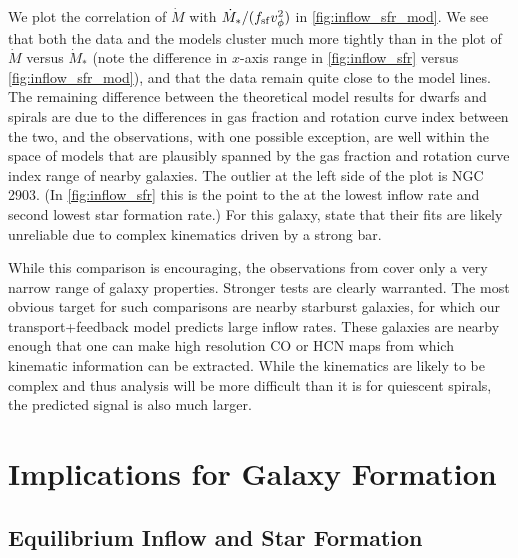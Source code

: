 \documentclass[useAMS,usenatbib]{mn2e}
\begin{document}
We plot the correlation of $\dot{M}$ with $\dot{M}_*/(f_{\rm sf} v_\phi^2)$ in \autoref{fig:inflow_sfr_mod}. We see that both the data and the models cluster much more tightly than in the plot of $\dot{M}$ versus $\dot{M}_*$ (note the difference in $x$-axis range in \autoref{fig:inflow_sfr} versus \autoref{fig:inflow_sfr_mod}), and that the data remain quite close to the model lines. The remaining difference between the theoretical model results for dwarfs and spirals are due to the differences in gas fraction and rotation curve index between the two, and the observations, with one possible exception, are well within the space of models that are plausibly spanned by the gas fraction and rotation curve index range of nearby galaxies. The outlier at the left side of the plot is NGC 2903. (In \autoref{fig:inflow_sfr} this is the point to the at the lowest inflow rate and second lowest star formation rate.) For this galaxy, \citet{schmidt16a} state that their fits are likely unreliable due to complex kinematics driven by a strong bar.

While this comparison is encouraging, the observations from \citet{schmidt16a} cover only a very narrow range of galaxy properties. Stronger tests are clearly warranted. The most obvious target for such comparisons are nearby starburst galaxies, for which our transport+feedback model predicts large inflow rates. These galaxies are nearby enough that one can make high resolution CO or HCN maps from which kinematic information can be extracted. While the kinematics are likely to be complex and thus analysis will be more difficult than it is for quiescent spirals, the predicted signal is also much larger.


\section{Implications for Galaxy Formation}
\label{sec:discussion}

\subsection{Equilibrium Inflow and Star Formation}
\label{ssec:gal_eq}
\end{document}
